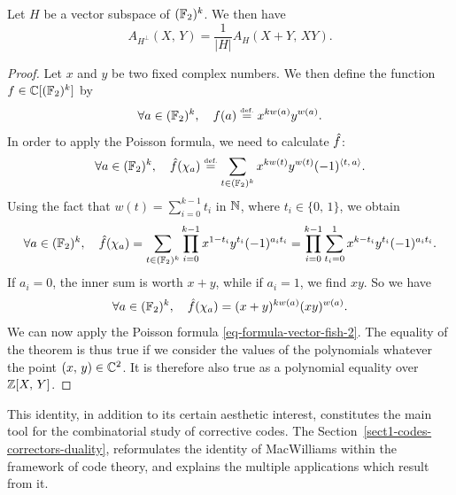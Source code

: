 \begin{thm}
\label{thm-id-mac-williams}
  Let $ H $ be a vector subspace of $ (\mathbb{F}_2)^k $. We then have
\begin{equation*}
A_{H^{\bot}} (X, \, Y) = \frac{1}{| H |} A_{H} (X + Y, \, XY).
\end{equation*}
\end{thm}
\begin{proof}
Let $ x $ and $ y $ be two fixed complex numbers. We then define the function $ f \in \mathbb{C} [(\mathbb{F}_2)^k] $ by
\begin{equation*}
\forall a \in (\mathbb{F}_2)^k, \quad f(a) \stackrel{\mbox{\upshape\tiny def.}}{=} x^{kw (a)} y^{w (a)}.
\end{equation*}
In order to apply the Poisson formula, we need to calculate $ \hat{f} $:
\begin{equation*}
\forall a \in (\mathbb{F}_2)^k, \quad \hat{f} (\chi_a) \stackrel{\mbox{\upshape\tiny def.}}{=} \sum_{t \in (\mathbb{F}_2)^k}{x^{kw (t)} y^{w (t)} (-1)^{\langle t,\,a\rangle}}.
\end{equation*}
Using the fact that $ w (t) = \sum_{i = 0}^{k-1}{t_i} $ in $ \mathbb{N} $, where $ t_i \in \{0, \, 1\} $, we obtain
\begin{equation*}
\forall a \in (\mathbb{F}_2)^k, \quad \hat{f} (\chi_a) = \sum_{t \in (\mathbb{F}_2)^k}{\prod_{i = 0}^{k-1 }{x^{1-t_i} y^{t_i} (- 1)^{a_i t_i}}} = \prod_{i = 0}^{k-1}{\sum_{t_i = 0}^1{x^{k-t_i} y^{t_i} (-1)^{a_i t_i}}}.
\end{equation*}
If $ a_i = 0 $, the inner sum is worth $ x + y $, while if $ a_i = 1 $, we find $ xy $. So we have
\begin{equation*}
\forall a \in (\mathbb{F}_2)^k, \quad \hat{f} (\chi_a) = (x + y)^{kw (a)} (xy)^{w (a)}.
\end{equation*}
We can now apply the Poisson formula \eqref{eq-formula-vector-fish-2}. The equality of the theorem is thus true if we consider the values of the polynomials whatever the point $ (x, \, y) \in \mathbb{C}^2 $. It is therefore also true as a polynomial equality over $ \mathbb{Z} [X, \, Y] $.
\end{proof}
 
 
 
This identity, in addition to its certain aesthetic interest, constitutes the main tool for the combinatorial study of corrective codes. The Section~\ref{sect1-codes-correctors-duality}, reformulates the identity of MacWilliams within the framework of code theory, and explains the multiple applications which result from it.

